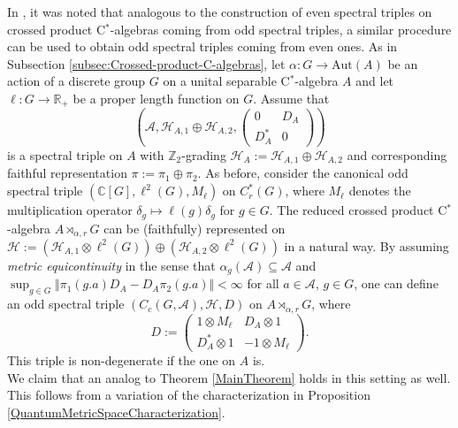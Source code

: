 \documentclass[a4paper,11pt,reqno]{amsart}
\numberwithin{equation}{section}
\numberwithin{equation}{section}
\theoremstyle{definition}
\theoremstyle{remark}
\theoremstyle{remark}
\begin{document}
In \cite[Subsection 2.4]{HSWZ13}, it was noted that analogous to the
construction of even spectral triples on crossed product C$^{\ast}$-algebras
coming from odd spectral triples, a similar procedure can be used
to obtain odd spectral triples coming from even ones. As in Subsection
\ref{subsec:Crossed-product-C-algebras}, let $\alpha:G\rightarrow\text{Aut}(A)$
be an action of a discrete group $G$ on a unital separable C$^{\ast}$-algebra
$A$ and let $\ell:G\rightarrow\mathbb{R}_{+}$ be a proper length
function on $G$. Assume that 
\[
\left(\mathcal{A},\mathcal{H}_{A,1}\oplus\mathcal{H}_{A,2},\left(\begin{array}{cc}
0 & D_{A}\\
D_{A}^{\ast} & 0
\end{array}\right)\right)
\]
is a spectral triple on $A$ with $\mathbb{Z}_{2}$-grading $\mathcal{H}_{A}:=\mathcal{H}_{A,1}\oplus\mathcal{H}_{A,2}$
and corresponding faithful representation $\pi:=\pi_{1}\oplus\pi_{2}$.
As before, consider the canonical odd spectral triple $(\mathbb{C}[G],\ell^{2}(G),M_{\ell})$
on $C_{r}^{\ast}(G)$, where $M_{\ell}$ denotes the multiplication
operator $\delta_{g}\mapsto\ell(g)\delta_{g}$ for $g\in G$. The
reduced crossed product C$^{\ast}$-algebra $A\rtimes_{\alpha,r}G$
can be (faithfully) represented on $\mathcal{H}:=(\mathcal{H}_{A,1}\otimes\ell^{2}(G))\oplus(\mathcal{H}_{A,2}\otimes\ell^{2}(G))$
in a natural way. By assuming \emph{metric equicontinuity} in the
sense that $\alpha_{g}(\mathcal{A})\subseteq\mathcal{A}$ and $\sup_{g\in G}\Vert\pi_{1}(g.a)D_{A}-D_{A}\pi_{2}(g.a)\Vert<\infty$
for all $a\in\mathcal{A}$, $g\in G$, one can define an odd spectral
triple $(C_{c}(G,\mathcal{A}),\mathcal{H},D)$ on $A\rtimes_{\alpha,r}G$,
where
\begin{equation}
D:=\left(\begin{array}{cc}
1\otimes M_{\ell} & D_{A}\otimes1\\
D_{A}^{\ast}\otimes1 & -1\otimes M_{\ell}
\end{array}\right).\label{eq:DiracOperator}
\end{equation}
This triple is non-degenerate if the one on $A$ is. \\

We claim that an analog to Theorem \ref{MainTheorem} holds in this setting as well. This
follows from a variation of the characterization in Proposition \ref{QuantumMetricSpaceCharacterization}.
\end{document}
